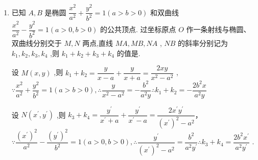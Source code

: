 \begin{enumerate}
\begin{jieda}
        根据三点共线有$\vv{F_2A} = \dfrac{5}{9} \vv{F_2P} + \dfrac{4}{9}\vv{F_2M}$. 
        
        设$P(x_0, y_0)$，根据椭圆第二定义可知$t = \dfrac{5}{4}x_0-4$，$\vv{F_2M}= \left(\dfrac{25}{16}x_0-5, 0\right)$. 则$\vv{F_2P} = (x_0-5, y_0)$，故$\vv{F_2A} = \left(\dfrac{5}{4}x_0-5, \dfrac{5}{9}y_0\right)$

        故$\vv{OP} = (x_0, y_0)$，$\vv{OA} = \left(\dfrac{5}{4}x_0, \dfrac{5}{9}y_0\right)$，因此$\vv{OP} \cdot \vv{OA} = \dfrac{5}{4}x_0^2 + \dfrac{5}{9}y_0^2 = \dfrac{5}{4}x_0^2 - \dfrac{5}{9}\left(\dfrac{9}{16}x_0^2-9\right) = \dfrac{15}{16}x_0^2+5 \in (20, +\infty)$

        \ps 数形结合较容易猜出答案
        
        \ps $\dfrac{{x}^{2}}{a^2} - \dfrac{{y}^{2}}{b^2} = 1$双曲线右支上的焦点三角形右侧的旁心在双曲线$\dfrac{x^2}{c^2}-\dfrac{(1+e)^2y^2}{b^2} = 1$上.
    \end{jieda}

    \item 已知 $A,B$ 是椭圆 $\dfrac{{x}^{2}}{{a}^{2}} + \dfrac{{y}^{2}}{{b}^{2}} = 1\left( {a > b > 0}\right)$ 和双曲线 $\dfrac{{x}^{2}}{{a}^{2}} - \dfrac{{y}^{2}}{{b}^{2}} = 1\left( {a > 0,b > 0}\right)$ 的公共顶点. 过坐标原点 $O$ 作一条射线与椭圆、双曲线分别交于 $M,N$ 两点,直线 ${MA},{MB},{NA}$ , ${NB}$ 的斜率分别记为 ${k}_{1},{k}_{2},{k}_{3},{k}_{4}$ ,则 ${k}_{1} + {k}_{2} + {k}_{3} + {k}_{4}$ 的值是.
    \begin{jieda}
        设 $M\left( {x,y}\right)$ ,则 ${k}_{1} + {k}_{2} = \dfrac{y}{x - a} + \dfrac{y}{x + a} = \dfrac{2xy}{{x}^{2} - {a}^{2}}$ ,
        $\because \dfrac{{x}^{2}}{{a}^{2}} + \dfrac{{y}^{2}}{{b}^{2}} = 1\left( {a > b > 0}\right) ,\therefore \dfrac{y}{{x}^{2} - {a}^{2}} =  - \dfrac{{b}^{2}}{{a}^{2}y}\therefore {k}_{1} + {k}_{2} =  - \dfrac{2{b}^{2}x}{{a}^{2}y}$

        
        设 $N\left( {{x}^{\prime },{y}^{\prime }}\right)$ ,则 ${k}_{3} + {k}_{4} = \dfrac{{y}^{\prime }}{{x}^{\prime } + a} + \dfrac{{y}^{\prime }}{{x}^{\prime } - a} = \dfrac{2{x}^{\prime }{y}^{\prime }}{{\left( {x}^{\prime }\right) }^{2} - {a}^{2}}$，$\because \dfrac{{\left( {x}^{\prime }\right) }^{2}}{{a}^{2}} - \dfrac{{\left( {y}^{\prime }\right) }^{2}}{{b}^{2}} = 1\left( {a > 0,b > 0}\right) ,\therefore \dfrac{{y}^{\prime }}{{\left( {x}^{\prime }\right) }^{2} - {a}^{2}} = \dfrac{{b}^{2}}{{a}^{2}{y}^{\prime }}\therefore {k}_{3} + {k}_{4} = \dfrac{2{b}^{2}{x}^{\prime }}{{a}^{2}{y}^{\prime }}$ .
        

\end{jieda}
\end{enumerate}
